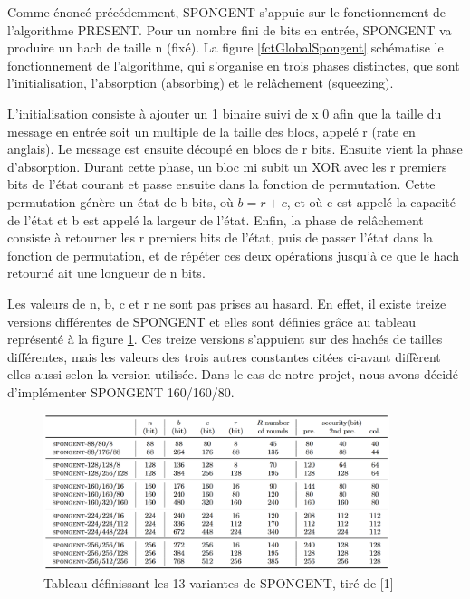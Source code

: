 		Comme énoncé précédemment, SPONGENT s’appuie sur le fonctionnement de l’algorithme PRESENT.
		Pour un nombre fini de bits en entrée, SPONGENT va produire un hach de taille n (fixé).
		La figure \ref{fctGlobalSpongent} schématise le fonctionnement de l’algorithme, qui s’organise en trois phases distinctes, que sont l’initialisation, l’absorption (absorbing) et le relâchement (squeezing).

		L’initialisation consiste à ajouter un 1 binaire suivi de x 0 afin que la taille du message en entrée soit un multiple de la taille des blocs, appelé r (rate en anglais).
		Le message est ensuite découpé en blocs de r bits.
		Ensuite vient la phase d’absorption.
		Durant cette phase, un bloc mi subit un XOR avec les r premiers bits de l’état courant et passe ensuite dans la fonction de permutation.
		Cette permutation génère un état de b bits, où $b = r + c$, et où c est appelé la capacité de l’état et b est appelé la largeur de l’état.
		Enfin, la phase de relâchement consiste à retourner les r premiers bits de l’état, puis de passer l’état dans la fonction de permutation,
		et de répéter ces deux opérations jusqu’à ce que le hach retourné ait une longueur de n bits.

		Les valeurs de n, b, c et r ne sont pas prises au hasard. En effet, il existe treize versions différentes de SPONGENT et elles sont définies grâce au tableau représenté à la figure \ref{variantesSpongent}.
		Ces treize versions s’appuient sur des hachés de tailles différentes, mais les valeurs des trois autres constantes citées ci-avant diffèrent elles-aussi selon la version utilisée.
		Dans le cas de notre projet, nous avons décidé d’implémenter SPONGENT 160/160/80.

		\begin{figure}[!h]
			\centering
			\includegraphics[width=0.9\textwidth]{imgs/Spongent/varianteSpongent.png}
			\caption{Tableau définissant  les 13 variantes de SPONGENT, tiré de [1]}
			\label{variantesSpongent}
   		\end{figure}

